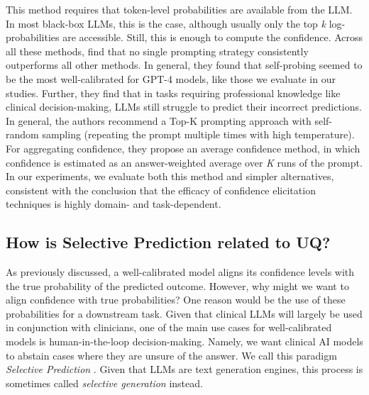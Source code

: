 This method requires that token-level probabilities are available from the LLM. In most black-box LLMs, this is the case, although usually only the top \emph{k} log-probabilities are accessible. Still, this is enough to compute the confidence. Across all these methods, \citet{xiongCanLLMsExpress2023} find that no single prompting strategy consistently outperforms all other methods. In general, they found that self-probing seemed to be the most well-calibrated for GPT-4 models, like those we evaluate in our studies. Further, they find that in tasks requiring professional knowledge like clinical decision-making, LLMs still struggle to predict their incorrect predictions. In general, the authors recommend a Top-K prompting approach  with self-random sampling (repeating the prompt multiple times with high temperature). For aggregating confidence, they propose an average confidence method, in which confidence is estimated as an answer-weighted average over \emph{K} runs of the prompt.  In our experiments, we evaluate both this method and simpler alternatives, consistent with the conclusion that the efficacy of confidence elicitation techniques is highly domain- and task-dependent.

\subsection{How is Selective Prediction related to UQ?}
As previously discussed, a well-calibrated model aligns its confidence levels with the true probability of the predicted outcome. However, why might we want to align confidence with true probabilities? One reason would be the use of these probabilities for a downstream task. Given that clinical LLMs will largely be used in conjunction with clinicians, one of the main use cases for well-calibrated models is human-in-the-loop decision-making. Namely, we want clinical AI models to abstain cases where they are unsure of the answer. We call this paradigm \emph{Selective Prediction} \citep{varshney-etal-2022-investigating, xin-etal-2021-art}. Given that LLMs are text generation engines, this process is sometimes called \emph{selective generation} instead. 

